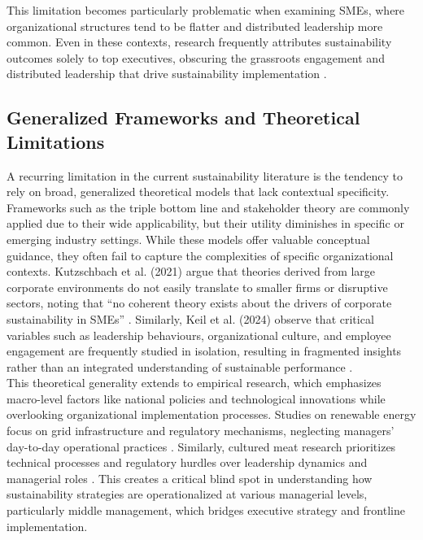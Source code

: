 	This limitation becomes particularly problematic when examining SMEs, where organizational structures tend to be flatter and distributed leadership more common. Even in these contexts, research frequently attributes sustainability outcomes solely to top executives, obscuring the grassroots engagement and distributed leadership that drive sustainability implementation \cite{birkinshaw2010}. \\
	
	\subsection{Generalized Frameworks and Theoretical Limitations}
	A recurring limitation in the current sustainability literature is the tendency to rely on broad, generalized theoretical models that lack contextual specificity. Frameworks such as the triple bottom line and stakeholder theory are commonly applied due to their wide applicability, but their utility diminishes in specific or emerging industry settings. While these models offer valuable conceptual guidance, they often fail to capture the complexities of specific organizational contexts. Kutzschbach et al. (2021) argue that theories derived from large corporate environments do not easily translate to smaller firms or disruptive sectors, noting that “no coherent theory exists about the drivers of corporate sustainability in SMEs” \cite{kutzschbach2021a}. Similarly, Keil et al. (2024) observe that critical variables such as leadership behaviours, organizational culture, and employee engagement are frequently studied in isolation, resulting in fragmented insights rather than an integrated understanding of sustainable performance \cite{keil2024a}. \\
	
	This theoretical generality extends to empirical research, which emphasizes macro-level factors like national policies and technological innovations while overlooking organizational implementation processes. Studies on renewable energy focus on grid infrastructure and regulatory mechanisms, neglecting managers’ day-to-day operational practices \cite{IRENA2020}. Similarly, cultured meat research prioritizes technical processes and regulatory hurdles over leadership dynamics and managerial roles \cite{Bryant2020}. This creates a critical blind spot in understanding how sustainability strategies are operationalized at various managerial levels, particularly middle management, which bridges executive strategy and frontline implementation. \\
	
